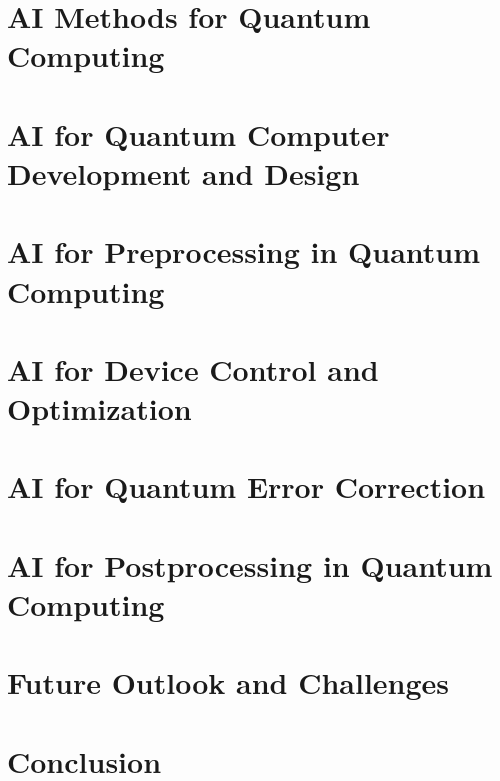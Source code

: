 \documentclass[conference]{IEEEtran}
\begin{document}
\section{AI Methods for Quantum Computing}


\section{AI for Quantum Computer Development and Design}


\section{AI for Preprocessing in Quantum Computing}


\section{AI for Device Control and Optimization}


\section{AI for Quantum Error Correction}


\section{AI for Postprocessing in Quantum Computing}


\section{Future Outlook and Challenges}


\section{Conclusion}


  
 
\end{document}
